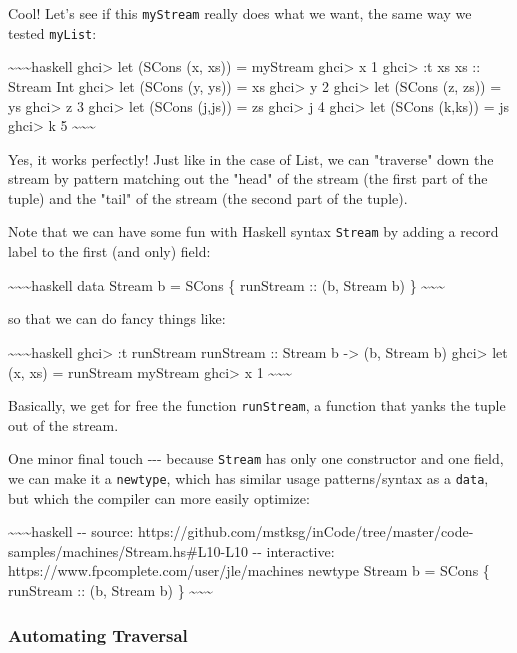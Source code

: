 \documentclass[]{article}
\begin{document}
Cool! Let's see if this \texttt{myStream} really does what we want, the same way
we tested \texttt{myList}:

\textasciitilde{}\textasciitilde{}\textasciitilde{}haskell ghci\textgreater{}
let (SCons (x, xs)) = myStream ghci\textgreater{} x 1 ghci\textgreater{} :t xs
xs :: Stream Int ghci\textgreater{} let (SCons (y, ys)) = xs ghci\textgreater{}
y 2 ghci\textgreater{} let (SCons (z, zs)) = ys ghci\textgreater{} z 3
ghci\textgreater{} let (SCons (j,js)) = zs ghci\textgreater{} j 4
ghci\textgreater{} let (SCons (k,ks)) = js ghci\textgreater{} k 5
\textasciitilde{}\textasciitilde{}\textasciitilde{}

Yes, it works perfectly! Just like in the case of List, we can "traverse" down
the stream by pattern matching out the "head" of the stream (the first part of
the tuple) and the "tail" of the stream (the second part of the tuple).

Note that we can have some fun with Haskell syntax \texttt{Stream} by adding a
record label to the first (and only) field:

\textasciitilde{}\textasciitilde{}\textasciitilde{}haskell data Stream b = SCons
\{ runStream :: (b, Stream b) \}
\textasciitilde{}\textasciitilde{}\textasciitilde{}

so that we can do fancy things like:

\textasciitilde{}\textasciitilde{}\textasciitilde{}haskell ghci\textgreater{} :t
runStream runStream :: Stream b -\textgreater{} (b, Stream b) ghci\textgreater{}
let (x, xs) = runStream myStream ghci\textgreater{} x 1
\textasciitilde{}\textasciitilde{}\textasciitilde{}

Basically, we get for free the function \texttt{runStream}, a function that
yanks the tuple out of the stream.

One minor final touch -\/-\/- because \texttt{Stream} has only one constructor
and one field, we can make it a \texttt{newtype}, which has similar usage
patterns/syntax as a \texttt{data}, but which the compiler can more easily
optimize:

\textasciitilde{}\textasciitilde{}\textasciitilde{}haskell -\/- source:
https://github.com/mstksg/inCode/tree/master/code-samples/machines/Stream.hs\#L10-L10
-\/- interactive: https://www.fpcomplete.com/user/jle/machines newtype Stream b
= SCons \{ runStream :: (b, Stream b) \}
\textasciitilde{}\textasciitilde{}\textasciitilde{}

\subsubsection{Automating Traversal}
\end{document}
